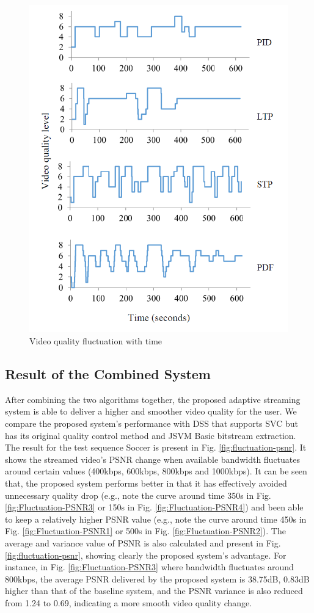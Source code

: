 \documentclass[journal]{IEEEtran}
\begin{document}
\begin{figure}
\centering
\includegraphics[width = 0.9\linewidth]{Fluctuation.png}
\caption{Video quality fluctuation with time \label{fig:fluctuation}}
\end{figure}

\subsection{Result of the Combined System}
\label{subsec:exp-combined}

After combining the two algorithms together, the proposed adaptive streaming system is able to deliver a higher and smoother video quality for the user. We compare the proposed system's performance with DSS that supports SVC but has its original quality control method and JSVM Basic bitstream extraction. The result for the test sequence Soccer is present in Fig. \ref{fig:fluctuation-psnr}. It shows the streamed video's PSNR change when available bandwidth fluctuates around certain values (400kbps, 600kbps, 800kbps and 1000kbps). It can be seen that, the proposed system performs better in that it has effectively avoided unnecessary quality drop (e.g., note the curve around time 350s in Fig. \ref{fig:Fluctuation-PSNR3} or 150s in Fig. \ref{fig:Fluctuation-PSNR4}) and been able to keep a relatively higher PSNR value (e.g., note the curve around time 450s in Fig. \ref{fig:Fluctuation-PSNR1} or 500s in Fig. \ref{fig:Fluctuation-PSNR2}). The average and variance value of PSNR is also calculated and present in Fig. \ref{fig:fluctuation-psnr}, showing clearly the proposed system's advantage. For instance, in Fig. \ref{fig:Fluctuation-PSNR3} where bandwidth fluctuates around 800kbps, the average PSNR delivered by the proposed system is 38.75dB, 0.83dB higher than that of the baseline system, and the PSNR variance is also reduced from 1.24 to 0.69, indicating a more smooth video quality change.
\end{document}

